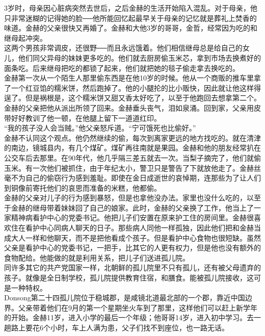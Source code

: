 3岁时，母亲因心脏病突然去世后，之后金赫的生活开始陷入混乱。对于母亲，他只非常迷糊的记得她的脸──他所能回忆起最早关于母亲的记忆就是葬礼上焚香的味道。金赫的父亲很快又再婚了。金赫和大他3岁的哥哥，金哲，经常因为吃的和继母起冲突。\\

这两个男孩非常调皮，还很野──而且永远饿着。他们相信继母总是给自己的女儿，他们同父异母的妹妹更多吃的。他们就去厨房偷玉米芯，拿到市场去换煮好的面条吃。后来继母把吃的都锁了起来，他们就把她的毯子偷走拿去换吃的。\\

金赫第一次从一个陌生人那里偷东西是在他10岁的时候。他从一个商贩的推车里拿了一个红豆馅的糯米饼，然后跑掉了。他的小腿抡的比小贩快，因此就让他这样得逞了。但是祸根是，这个糯米饼又甜又香太好吃了，以至于他跑回去想拿第二个。\\

金赫的父亲把他从派出所领了回来。金赫垂头丧气，泪如泉涌。回到家，父亲用皮带好好教训了他一顿，在他腿上留下一道道红印。\\

“我的孩子没人会当贼。”他父亲怒斥道。“宁可饿死也比偷好。”\\

金赫不认同这个观点。他仍然继续的偷，每次到离家更远的地方找吃的。就在清津的南边，镜城县内，有几个煤矿。煤矿再往南就是果园。金赫和他的朋友经常扒在公交车后去那里。在90年代，他几乎隔三差五就去一次。当梨子摘完了，他们就偷玉米。有一次他们被抓住，由于年纪太小，警卫只是警告了下就放他走了。金赫丝毫不为自己的偷窃行为感到羞耻。即使在金日成逝世的哀悼期，连那些为了让人们到铜像前寄托他们的哀思而准备的米糕，他都偷。\\

金赫的父亲对儿子的行为感到暴怒，但是也拿他没办法。家里也没什么吃的，以至于金赫的继母带着妹妹回了自己的娘家。此时，金赫的父亲换了工作，他当上了一家精神病看护中心的党委书记。他把儿子们安置在原来护工住的房间里。金赫很喜欢住在看护中心同病人聊天的日子。那些病人同他一样孤独，因此他们把和金赫当成大人一样和他聊天，而不是把他看成个孩子。但是看护中心食物也很短缺。虽然父亲是看护中心的党委书记，一把手，比其它的人更有权力，但是他也没有额外的食物配给。他能做的就是利用关系，把儿子们送进孤儿院。\\

同许多其它的共产党国家一样，北朝鲜的孤儿院里不只有孤儿，还有被父母遗弃的孩子。就像是全日制学校，孤儿院提供教育住宿，和膳食。能被孤儿院接收，这可是一种特权。\\

Donsong第二十四孤儿院位于稳城郡，是咸镜北道最北部的一个郡，靠近中国边界。父亲带着他们在9月的第一个星期坐火车到了那里，这样他们可以赶上新学年的开始。金赫11岁，进入小学的最后一个年级；他哥哥14岁，进入初中学习。去一趟路上要花6个小时，车上人满为患，父子们找不到座位，也一路无话。\\

